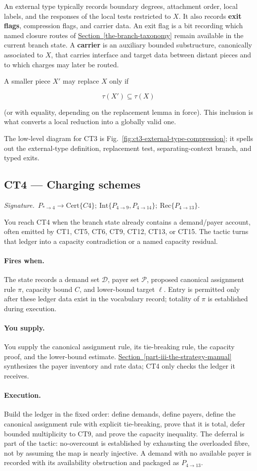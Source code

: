 \documentclass[
  11pt,
]{article}
\theoremstyle{definition}
\newcommand{\secref}[1]{\hyperref[#1]{Section~\ref*{#1}}}
\newcommand{\ctsignature}[1]{\par\noindent\emph{Signature.}\ #1\par\medskip}
\newcommand{\ctcert}[1]{\mathrm{Cert}\{#1\}}
\newcommand{\ctint}[1]{\mathrm{Int}\{#1\}}
\newcommand{\ctrec}[1]{\mathrm{Rec}\{#1\}}
\newcommand{\ctpar}[1]{\paragraph{#1.}}
\begin{document}
An external type typically records boundary degrees, attachment order,
local labels, and the responses of the local tests restricted to \(X\).
It also records \textbf{exit flags}, compression flags, and carrier
data. An exit flag is a bit recording which named closure routes of
\secref{the-branch-taxonomy} remain available in the current branch state. A
\textbf{carrier} is an auxiliary bounded substructure, canonically
associated to \(X\), that carries interface and target data between
distant pieces and to which charges may later be routed.

A smaller piece \(X'\) may replace \(X\) only if

\[
\tau(X') \subseteq \tau(X)
\]

(or with equality, depending on the replacement lemma in force). This
inclusion is what converts a local reduction into a globally valid one.

The low-level diagram for CT3 is Fig.~\ref{fig:ct3-external-type-compression};
it spells out the external-type definition, replacement test,
separating-context branch, and typed exits.



\subsection{CT4 --- Charging schemes}\label{ct:4}\label{charging-schemes}
\ctsignature{\(P_{\ast\to4}\to \ctcert{C4};\ \ctint{P_{4\to9},P_{4\to14}};\ \ctrec{P_{4\to13}}\).}

You reach CT4 when the branch state already contains a demand/payer
account, often emitted by CT1, CT5, CT6, CT9, CT12, CT13, or CT15.  The
tactic turns that ledger into a capacity contradiction or a named
capacity residual.

\ctpar{Fires when}
The state records a demand set \(\mathcal D\), payer set \(\mathcal P\),
proposed canonical assignment rule \(\pi\), capacity bound \(C\), and
lower-bound target \(\ell\).  Entry is permitted only after these ledger
data exist in the vocabulary record; totality of \(\pi\) is established
during execution.

\ctpar{You supply}
You supply the canonical assignment rule, its tie-breaking rule, the capacity
proof, and the lower-bound estimate.  \secref{part-iii-the-strategy-manual} synthesizes the payer
inventory and rate data; CT4 only checks the ledger it receives.

\ctpar{Execution}
Build the ledger in the fixed order: define demands, define payers,
define the canonical assignment rule with explicit tie-breaking, prove
that it is total, defer bounded
multiplicity to CT9, and prove the capacity inequality.  The deferral is
part of the tactic: no-overcount is established by exhausting the
overloaded fibre, not by assuming the map is nearly injective.  A demand
with no available payer is recorded with its availability obstruction
and packaged as \(P_{4\to13}\).
\end{document}
